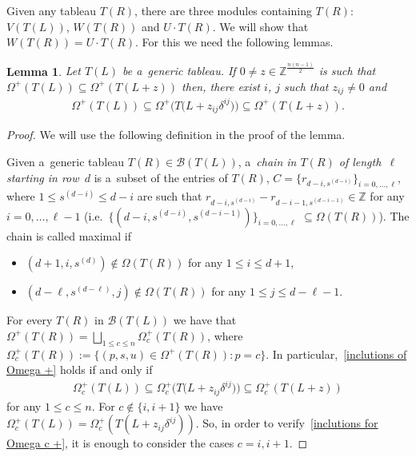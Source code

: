 \documentclass[pdftex]{sigma}
\numberwithin{equation}{section}
\newtheorem{Lemma}[Theorem]{Lemma}
\begin{document}
Given any tableau $T(R)$, there are three modules containing $T(R)$: $V(T(L))$, $ W(T(R))$ and $U\cdot T(R)$.
We will show that $ W(T(R))=U\cdot T(R)$.
For this we need the following lemmas.

\begin{Lemma}
\label{paths for connected tableaux}
Let $T(L)$ be a~generic tableau.
If $0\neq z\in\mathbb{Z}^{\frac{n(n-1)}{2}}$ is such that $\Omega^{+}(T(L))\subseteq\Omega^{+}(T(L+z))$ then, there
exist $i$, $j$ such that $z_{ij}\neq 0$ and
\begin{gather}
\label{inclutions of Omega +}
\Omega^{+}(T(L))\subseteq\Omega^{+}\big(T\big(L+z_{ij}\delta^{ij}\big)\big)\subseteq\Omega^{+}(T(L+z)).
\end{gather}
\end{Lemma}
\begin{proof}
We will use the following def\/inition in the proof of the lemma.

\begin{Definition}
Given a~generic tableau $T(R)\in\mathcal{B}(T(L))$, a~\emph{chain in $T(R)$ of length~$\ell$ starting in row~$d$} is
a~subset of the entries of $T(R)$, $C=\{r_{d-i,s^{(d-i)}}\}_{i=0,\ldots, \ell}$, where $1\leq s^{(d-i)}\leq d-i$ are
such that $r_{d-i,s^{(d-i)}}-r_{d-i-1,s^{(d-i-1)}}\in\mathbb{Z}$ for any $i=0,\ldots,\ell-1$
(i.e.~$\{(d-i,s^{(d-i)},s^{(d-i-1)})\}_{i=0,\ldots,\ell}$ $\subseteq\Omega(T(R))$). The chain is called maximal if
\begin{itemize}\itemsep=0pt
\item[(i)] $(d+1,i,s^{(d)})\notin\Omega(T(R))$ for any $1\leq i\leq d+1$,
\item[(ii)] $(d-\ell,s^{(d-\ell)},j)\notin\Omega(T(R))$ for any $1\leq j\leq d-\ell-1$.
\end{itemize}
\end{Definition}

For every $T(R)$ in $\mathcal{B}(T(L))$ we have that $\Omega^{+}(T(R))= \bigsqcup_{1\leq c\leq n}\Omega^{+}_{c}(T(R))$,
where $\Omega^{+}_{c}(T(R)):=\{(p,s,u)\in\Omega^{+}(T(R)): p=c\}$.
In particular,~\eqref{inclutions of Omega +} holds if and only if
\begin{gather}
\label{inclutions for Omega c +}
\Omega^{+}_{c}(T(L))\subseteq\Omega^{+}_{c}\big(T\big(L+z_{ij}\delta^{ij}\big)\big)\subseteq\Omega^{+}_{c}(T(L+z))
\end{gather}
for any $1\leq c\leq n$.
For $c\notin\{i,i+1 \}$ we have $\Omega^{+}_{c}(T(L))=\Omega^{+}_{c}(T(L+z_{ij}\delta^{ij}))$.
So, in order to verify~\eqref{inclutions for Omega c +}, it is enough to consider the cases $c=i, i+1$.


\end{proof}
\end{document}

